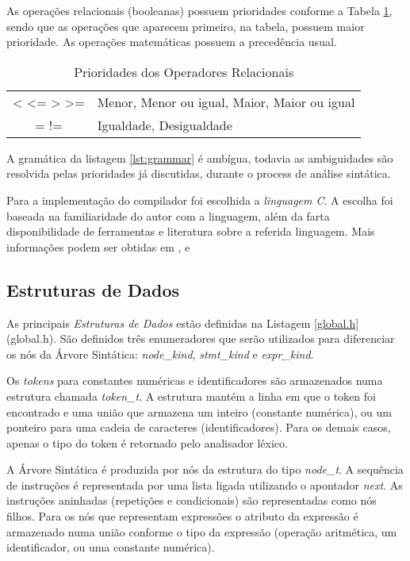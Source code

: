 As operações relacionais (booleanas) possuem prioridades conforme a Tabela
\ref{tab:prioridades}, sendo que as operações que aparecem primeiro, na
tabela, possuem maior prioridade. As operações matemáticas possuem a
precedência usual.

\begin{table}
	\begin{center}
		\begin{tabular}{c l}
			< <= > >= & Menor, Menor ou igual, Maior, Maior ou igual \\
			= !=      & Igualdade,  Desigualdade \\
		\end{tabular}
	\end{center}
	\caption{Prioridades dos Operadores Relacionais}
	\label{tab:prioridades}
\end{table}

A gramática da listagem \ref{lst:grammar} é ambígua, todavia as ambiguidades
são resolvida pelas prioridades já discutidas, durante o process de análise
sintática.

Para a implementação do compilador foi escolhida a \emph{linguagem C}. A
escolha foi baseada na familiaridade do autor com a linguagem, além da farta
disponibilidade de ferramentas e literatura sobre a referida linguagem. Mais
informações podem ser obtidas em ,  e

\subsection{Estruturas de Dados}
As principais \emph{Estruturas de Dados} estão definidas na Listagem
\ref{global.h} (global.h). São definidos três enumeradores que serão
utilizados para diferenciar os nós da Árvore Sintática: \emph{node\_kind},
\emph{stmt\_kind} e \emph{expr\_kind}.

Os \emph{tokens} para constantes numéricas e identificadores são armazenados
numa estrutura chamada \emph{token\_t}. A estrutura mantém a linha em que o token
foi encontrado e uma união que armazena um inteiro (constante numérica), ou um
ponteiro para uma cadeia de caracteres (identificadores). Para os demais
casos, apenas o tipo do token é retornado pelo analisador léxico.

A Árvore Sintática é produzida por nós da estrutura do tipo \emph{node\_t}. A
sequência de instruções é representada por uma lista ligada utilizando o
apontador \emph{next}. As instruções aninhadas (repetições e condicionais) são
representadas como nós filhos. Para os nós que representam expressões o
atributo da expressão é armazenado numa união conforme o tipo da expressão
(operação aritmética, um identificador, ou uma constante numérica).

